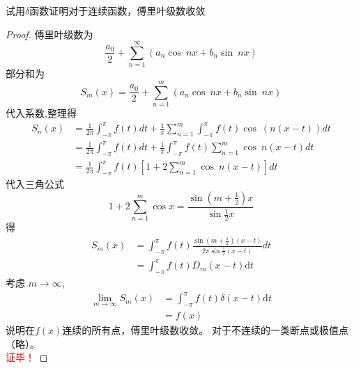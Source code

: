 \begin{example}
		试用$\delta$函数证明对于连续函数，傅里叶级数收敛
\end{example}
\begin{proof}
	傅里叶级数为
	\[\dfrac{a_0}{2} +\sum\limits_{n=1}^{\infty}  \left(  a_n \cos~ nx +  b_n \sin~ n x  \right) \]
	部分和为
	\[S_m(x) = \dfrac{a_0}{2} +\sum\limits_{n=1}^{m}  \left(  a_n \cos~ n x +  b_n \sin~ n x  \right) \]
	代入系数,整理得
	\[ \begin{aligned} S_n(x) & = \frac{1}{2\pi}\int_{-\pi}^\pi f(t)dt + \frac{1}{\pi}\sum\limits_{n=1}^{m} \int_{-\pi}^\pi f(t) \cos~ (n(x -t)) dt  \\
		&= \frac{1}{2\pi}\int_{-\pi}^\pi f(t)dt + \frac{1}{\pi} \int_{-\pi}^\pi f(t) \sum\limits_{n=1}^{m}\cos~n (x -t) dt \\
		&= \frac{1}{2\pi}\int_{-\pi}^\pi f(t) \left[ 1+ 2\sum\limits_{n=1}^{m}\cos~n (x -t) \right] dt
	\end{aligned}\]
	代入三角公式
	\[1+2\sum\limits_{n=1}^{m}\cos x = \frac{\sin (m+\frac{1}{2})x}{\sin\frac{1}{2}x}\]
	得
	\[ \begin{aligned} S_m(x) & =\int_{-\pi}^\pi f(t) \frac{\sin (m+\frac{1}{2})(x -t)}{2\pi \sin\frac{1}{2}(x -t) } dt \\
	&=\int_{-\pi}^\pi f(t) D_m(x-t) \mathrm{d} t	
	\end{aligned}\]
	考虑 $m \to \infty$, 
	\[ \begin{aligned} \lim_{m \to \infty} S_m(x) &= \int_{-\pi}^\pi f(t) \delta (x-t) \mathrm{d} t  \\
		&= f(x)
	 \end{aligned}\]
	说明在$f(x)$连续的所有点，傅里叶级数收敛。 对于不连续的一类断点或极值点（略）。\\
	\textcolor{red}{证毕！}
\end{proof}


